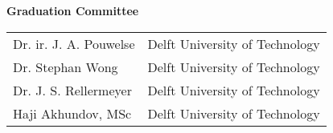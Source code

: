 \noindent \textbf{Graduation Committee}\\
\begin{tabular}{ll}
  Dr. ir. J. A. Pouwelse & Delft University of Technology \\
  Dr. Stephan Wong & Delft University of Technology \\
  Dr. J. S. Rellermeyer & Delft University of Technology \\
  Haji Akhundov, MSc & Delft University of Technology \\

\end{tabular}


\begin{abstract} %
\reportAbstract
\end{abstract}

\clearpage
